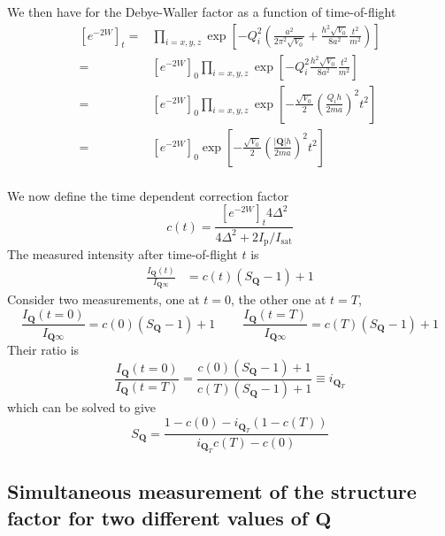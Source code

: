 \documentclass[11pt,letter]{article}
\newcommand{\bv}[1]{\ensuremath{\bm{#1}}}
\newcommand{\iisat}{\ensuremath{I_{\mathrm{p}}/I_{\mathrm{sat}}}}
\newcommand{\Iqtof}{\ensuremath{I_{\bv{Q}\infty} }}
\newcommand{\Iq}{\ensuremath{I_{\bv{Q}} }}
\newcommand{\iqT}{\ensuremath{i_{\bv{Q}_{T}} }}
\begin{document}
We then have for the Debye-Waller factor as a function of time-of-flight
\begin{equation}
\begin{split}
    [e^{-2W}]_{t} = &  
      \prod_{i=x,y,z} \exp\left[  -Q_{i}^{2} 
      \left(  \frac{a^{2}}{ 2 \pi^{2} \sqrt{V_{0}}} 
            + \frac{ h^{2} \sqrt{V_{0}} }{8 a^{2}} 
              \frac{ t^{2}}{m^{2} }\right) \right] \\
    =& [e^{-2W}]_{0} \prod_{i=x,y,z} \exp\left[  -Q_{i}^{2} 
            \frac{ h^{2} \sqrt{V_{0}} }{8 a^{2}} 
              \frac{ t^{2}}{m^{2} } \right] \\
    =& [e^{-2W}]_{0} \prod_{i=x,y,z} \exp\left[ -\frac{\sqrt{V_{0}}}{2}
           \left( \frac{ Q_{i} h }{2 m a  } \right)^{2}  t^{2}   \right] \\
    =& [e^{-2W}]_{0} \exp\left[ -\frac{\sqrt{V_{0}}}{2}
           \left( \frac{ |\bv{Q}| h }{2 m a  } \right)^{2}  t^{2}   \right] \\
\end{split}
\end{equation}

We now define the time dependent correction factor 
\begin{equation}
   c(t) =   \frac{ [e^{-2W}]_{t} 4 \Delta^{2}  } 
           {4 \Delta^{2} + 2 \iisat }  
\end{equation}
The measured intensity after time-of-flight $t$ is 
\begin{equation}
\begin{split} 
 \frac{\Iq(t)}{\Iqtof} 
&  = c(t) ( S_{\bv{Q}} - 1 ) + 1 
\end{split}
\end{equation}
Consider two measurements, one at $t=0$, the other one at $t=T$,
\begin{equation}
 \frac{ \Iq(t=0) }{\Iqtof} =  c(0)( S_{\bv{Q}} -1) + 1 
 \ \ \ \ \ \ \ \ \ \ 
  \frac{ \Iq(t=T) }{\Iqtof} =  c(T)( S_{\bv{Q}} -1) + 1 
\end{equation}
Their ratio is
\begin{equation} 
 \frac{ \Iq(t=0)}{ \Iq(t=T)} = 
 \frac{ c(0)( S_{\bv{Q}} - 1 ) + 1}{ c(T)( S_{\bv{Q}} - 1) + 1} 
      \equiv  \iqT 
\end{equation}
which can be solved to give
\begin{equation} 
  S_{\bv{Q}} = \frac{ 1 - c(0) - \iqT( 1- c(T))}
                    { \iqT c(T) - c(0) } 
\end{equation}

\subsection{Simultaneous measurement of the structure factor for two different
values of $\bv{Q}$}
\end{document}
